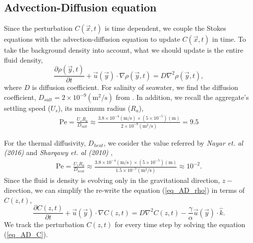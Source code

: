 \subsection{Advection-Diffusion equation}
Since the perturbation $C(\vec{x}, t)$ is time dependent, we couple the Stokes equations with the advection-diffusion equation to update $C(\vec{x}, t)$ in time. To take the background density into account, what we should update is the entire fluid density,
\begin{equation}
	\frac{\partial \rho(\vec{y},t)}{\partial t}
	+ \vec{u}(\vec{y}) \cdot \nabla \rho(\vec{y},t)
	 = D \nabla^2 \rho(\vec{y},t),
\label{eq_AD_rho}
\end{equation}
where $D$ is diffusion coefficient.
For salinity of seawater, we find the diffusion coefficient, $D_{salt} = 2 \times 10^{-9}  (\text{m}^2\text{/s})$ from  \cite{wollast_diffusion_1971}. In addition, we recall the aggregate's settling speed ($U_s$), its maximum radius ($R_a$),
\begin{align}
	\text{Pe} 
	= \frac{U_s R_a }{D_{salt}} 
	\approx \frac{3.8 \times 10^{-4}(\text{m/s}) \times \left(5 \times 10^{-5} \right) (\text{m})}{2 \times 10^{-9} (\text{m}^2\text{/s})} = 9.5
\end{align}
\par 
For the thermal diffusivity, $D_{heat}$, we cosider the value referred by {\it Nayar et. al (2016)} \cite{nayar_thermophysical_2016} and {\it Sharqawy et. al (2010)} \cite{sharqawy_thermophysical_2010},
\begin{align}
	\text{Pe} 
	= \frac{U_s R_a }{D_{heat}} 
	\approx \frac{3.8 \times 10^{-4}(\text{m/s}) \times \left(5 \times 10^{-5} \right) (\text{m})}{1.5 \times 10^{-7} (\text{m}^2\text{/s})} \approx 10^{-2}.
\end{align} 
Since the fluid is density is evolving only in the gravitational direction, $z-$direction, we can simplify the re-write the equation (\ref{eq_AD_rho}) in terms of $C(z,t)$, 
\begin{equation}
	\frac{\partial C(z,t)}{\partial t}
	+ \vec{u}(\vec{y}) \cdot \nabla C(z,t)
	 = D \nabla^2 C(z,t)
	 - \frac{\gamma}{\alpha}\vec{u}(\vec{y})  \cdot \hat{k}.
\label{eq_AD_C}
\end{equation}
We track the perturbation $C(z,t)$ for every time step by solving the equation (\ref{eq_AD_C}).
